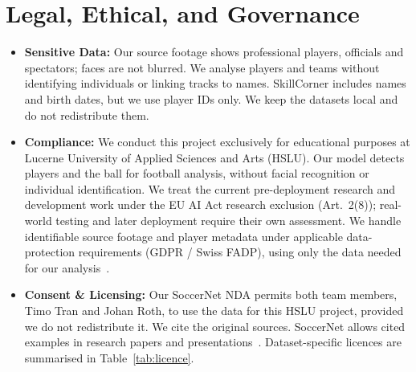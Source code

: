 \documentclass[11pt, a4paper]{article}
\begin{document}
\section{Legal, Ethical, and Governance}
\begin{itemize}
    \item \textbf{Sensitive Data:} Our source footage shows professional players, officials and spectators; faces are not blurred. We analyse players and teams without identifying individuals or linking tracks to names. SkillCorner includes names and birth dates, but we use player IDs only. We keep the datasets local and do not redistribute them.
    \item \textbf{Compliance:} We conduct this project exclusively for educational purposes at Lucerne University of Applied Sciences and Arts (HSLU). Our model detects players and the ball for football analysis, without facial recognition or individual identification. We treat the current pre-deployment research and development work under the EU AI Act research exclusion (Art.~2(8)); real-world testing and later deployment require their own assessment. We handle identifiable source footage and player metadata under applicable data-protection requirements (GDPR / Swiss FADP), using only the data needed for our analysis~\cite{gdpr,aiact,fadp}.
    \item \textbf{Consent \& Licensing:} Our SoccerNet NDA permits both team members, Timo Tran and Johan Roth, to use the data for this HSLU project, provided we do not redistribute it. We cite the original sources. SoccerNet allows cited examples in research papers and presentations~\cite{sndata,snfaq}. Dataset-specific licences are summarised in Table~\ref{tab:licence}.
\end{itemize}
\end{document}
